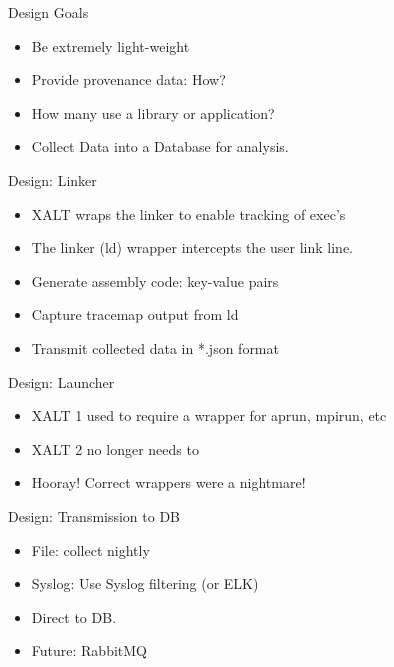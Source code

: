 \documentclass{beamer}
\begin{document}
\begin{frame}{Design Goals}
  \begin{itemize}
    \item Be extremely light-weight
    \item Provide provenance data: How?
    \item How many use a library or application?
    \item Collect Data into a Database for analysis.
  \end{itemize}
\end{frame}

\begin{frame}{Design: Linker}
  \begin{itemize}
    \item XALT wraps the linker to enable tracking of exec's
    \item The linker (ld) wrapper intercepts the user link line.
    \item Generate assembly code: key-value pairs
    \item Capture tracemap output from ld
    \item Transmit collected data in *.json format
  \end{itemize}
\end{frame}

\begin{frame}{Design: Launcher}
  \begin{itemize}
    \item XALT 1 used to require a wrapper for aprun, mpirun, etc
    \item XALT 2 no longer needs to
    \item Hooray! Correct wrappers were a nightmare!
  \end{itemize}
\end{frame}

\begin{frame}{Design: Transmission to DB}
  \begin{itemize}
    \item File: collect nightly
    \item Syslog: Use Syslog filtering (or ELK)
    \item Direct to DB.
    \item Future: RabbitMQ
  \end{itemize}
\end{frame}
\end{document}

